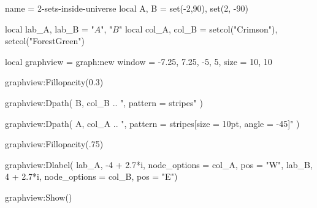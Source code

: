 \documentclass{standalone}
\begin{document}
\begin{luadraw}{name = 2-sets-inside-universe}
  local A, B = set(-2,90), set(2, -90)

  local lab_A, lab_B = "$A$", "$B$"
  local col_A, col_B = setcol("Crimson"), setcol("ForestGreen")

  local graphview = graph:new{
    window = {-7.25, 7.25, -5, 5},
    size   = {10, 10}
  }

  graphview:Fillopacity(0.3)

  graphview:Dpath(
    B,
    col_B .. ", pattern = stripes"
  )

  graphview:Dpath(
    A,
    col_A .. ", pattern = {stripes[size = 10pt, angle = -45]}"
  )

  graphview:Fillopacity(.75)

  graphview:Dlabel(
    lab_A, -4 + 2.7*i, {node_options = col_A, pos = "W"},
    lab_B,  4 + 2.7*i, {node_options = col_B, pos = "E"})

  graphview:Show()
\end{luadraw}
\end{document}
